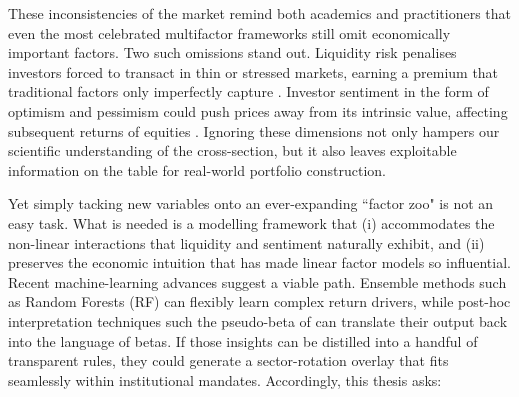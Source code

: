 
These inconsistencies of the market remind both academics and practitioners that even the most celebrated multifactor frameworks still omit economically important factors. Two such omissions stand out. Liquidity risk penalises investors forced to transact in thin or stressed markets, earning a premium that traditional factors only imperfectly capture \cite{pastor_2003,acharya_2005}. Investor sentiment in the form of optimism and pessimism could push prices away from its intrinsic value, affecting subsequent returns of equities \cite{wurgler_2007}. Ignoring these dimensions not only hampers our scientific understanding of the cross-section, but it also leaves exploitable information on the table for real-world portfolio construction.

Yet simply tacking new variables onto an ever-expanding “factor zoo" is not an easy task. What is needed is a modelling framework that (i) accommodates the non-linear interactions that liquidity and sentiment naturally exhibit, and (ii) preserves the economic intuition that has made linear factor models so influential. Recent machine-learning advances suggest a viable path. Ensemble methods such as Random Forests (RF) can flexibly learn complex return drivers, while post-hoc interpretation techniques such the pseudo-beta of can translate their output back into the language of betas. If those insights can be distilled into a handful of transparent rules, they could generate a sector-rotation overlay that fits seamlessly within institutional mandates. Accordingly, this thesis asks:

